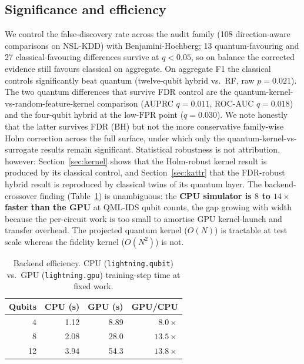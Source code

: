 \documentclass[preprint,11pt]{elsarticle}
\newcommand{\fpr}{\mathrm{FPR}}
\begin{document}
\subsection{Significance and efficiency}\label{sec:eff}
We control the false-discovery rate across the audit family (108 direction-aware comparisons on
NSL-KDD) with Benjamini-Hochberg; 13 quantum-favouring and 27 classical-favouring differences survive
at $q<0.05$, so on balance the corrected evidence still favours classical on aggregate. On aggregate F1
the classical controls significantly beat quantum (twelve-qubit hybrid vs.\ RF, raw $p=0.021$). The two
quantum differences that survive FDR control are the quantum-kernel-vs-random-feature-kernel comparison
(AUPRC $q=0.011$, ROC-AUC $q=0.018$) and the four-qubit hybrid at the low-$\fpr$ point ($q=0.030$). We
note honestly that the latter survives FDR (BH) but not the more conservative family-wise Holm
correction across the full surface, under which only the quantum-kernel-vs-surrogate results remain
significant. Statistical robustness is not attribution, however: Section~\ref{sec:kernel} shows that the Holm-robust
kernel result is produced by its classical control, and Section~\ref{sec:kattr} that the FDR-robust hybrid
result is reproduced by classical twins of its quantum layer. The
backend-crossover finding (Table~\ref{tab:eff}) is unambiguous: the
\textbf{CPU simulator is $8$ to $14\times$ faster than the GPU} at QML-IDS qubit counts, the gap growing
with width because the per-circuit work is too small to amortise GPU kernel-launch and transfer overhead.
The projected quantum kernel ($O(N)$) is tractable at test scale whereas the fidelity kernel ($O(N^2)$)
is not.

\begin{table}[t]
\centering
\caption{Backend efficiency. CPU (\texttt{lightning.qubit}) vs.\ GPU (\texttt{lightning.gpu})
training-step time at fixed work.}
\label{tab:eff}
\small
\renewcommand{\arraystretch}{1.2}
\setlength{\tabcolsep}{8pt}
\begin{tabular}{@{}rrrr@{}}
\toprule
\textbf{Qubits} & \textbf{CPU (s)} & \textbf{GPU (s)} & \textbf{GPU/CPU}\\
\midrule
 4 & 1.12 & \phantom{0}8.89           & $\phantom{0}8.0\times$\\
 8 & 2.08 & 28.0\phantom{0}           & $13.5\times$\\
12 & 3.94 & 54.3\phantom{0}           & $13.8\times$\\
\bottomrule
\end{tabular}
\end{table}
\end{document}
